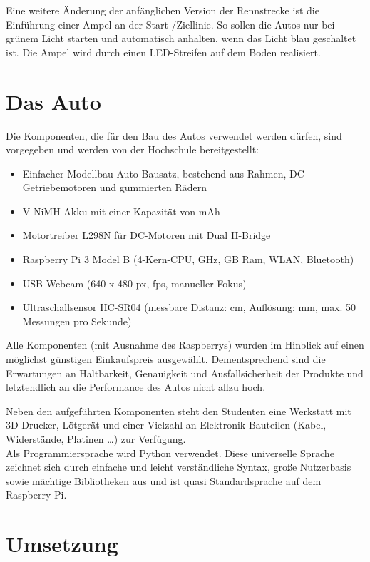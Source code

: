 \documentclass[a4paper, 12pt]{scrartcl}
\begin{document}
Eine weitere Änderung der anfänglichen Version der Rennstrecke ist die Einführung einer Ampel an der Start-/Ziellinie. So sollen die Autos nur bei grünem Licht starten und automatisch anhalten, wenn das Licht blau geschaltet ist. Die Ampel wird durch einen LED-Streifen auf dem Boden realisiert.

\section{Das Auto}
Die Komponenten, die für den Bau des Autos verwendet werden dürfen, sind vorgegeben und werden von der Hochschule bereitgestellt:

\begin{itemize}
	\item Einfacher Modellbau-Auto-Bausatz, bestehend aus Rahmen, DC-Getriebemotoren und gummierten Rädern
	\item \unit[7,2]{V} NiMH Akku mit einer Kapazität von \unit[4000]{mAh}
	\item Motortreiber L298N für DC-Motoren mit Dual H-Bridge
	\item Raspberry Pi 3 Model B (4-Kern-CPU, \unit[1,2]{GHz}, \unit[1]{GB} Ram, WLAN, Bluetooth)
	\item USB-Webcam (640 x 480 px, \unit[30]{fps}, manueller Fokus)
	\item Ultraschallsensor HC-SR04 (messbare Distanz: \unit[2-300]{cm}, Auflösung: \unit[3]{mm}, max. 50 Messungen pro Sekunde)
\end{itemize}


Alle Komponenten (mit Ausnahme des Raspberrys) wurden im Hinblick auf einen möglichst günstigen Einkaufspreis ausgewählt. Dementsprechend sind die Erwartungen an Haltbarkeit, Genauigkeit und Ausfallsicherheit der Produkte und letztendlich an die Performance des Autos nicht allzu hoch.

Neben den aufgeführten Komponenten steht den Studenten eine Werkstatt mit 3D-Drucker, Lötgerät und einer Vielzahl an Elektronik-Bauteilen (Kabel, Widerstände, Platinen …) zur Verfügung.\\

Als Programmiersprache wird Python verwendet. Diese universelle Sprache zeichnet sich durch einfache und leicht verständliche Syntax, große Nutzerbasis sowie mächtige Bibliotheken aus und ist quasi Standardsprache auf dem Raspberry Pi.

\section{Umsetzung}
\end{document}
